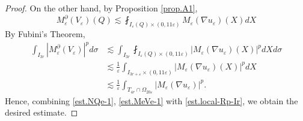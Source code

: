 \documentclass[reqno,12pt]{amsart} %
\newtheorem{theorem}{Theorem}[section]
\theoremstyle{definition}
\theoremstyle{remark}
\numberwithin{equation}{section}
\newcommand{\e}{\varepsilon}
\begin{document}
\begin{proof}
On the other hand, by Proposition \ref{prop.A1}, 
\begin{equation}
    M_\e^\partial (V_\e)(Q) \lesssim \fint_{I_\e(Q) \times (0,11\e)} M_\e(\nabla u_\e)(X) dX
\end{equation}
By Fubini's Theorem,
\begin{equation}\label{est.MeVe-1}
\begin{aligned}
    \int_{I_{3r}} |M_\e^\partial (V_\e)|^p d\sigma & \lesssim \int_{I_{3r}} \fint_{I_{\e}(Q) \times (0,11\e)} |M_\e(\nabla u_\e)(X)|^p dX d\sigma \\
    & \lesssim \frac{1}{\e} \int_{I_{3r+\e} \times (0,11\e)}  |M_\e(\nabla u_\e)(X)|^p dX \\
    & \lesssim \frac{1}{\e} \int_{T_{4r} \cap \Omega_{20\e}} |M_\e(\nabla u_\e)|^p.
\end{aligned}    
\end{equation}
Hence, combining \eqref{est.NQe-1}, \eqref{est.MeVe-1} with \eqref{est.local-Rp-Ir}, we obtain the desired estimate.
\end{proof}

\end{document}

